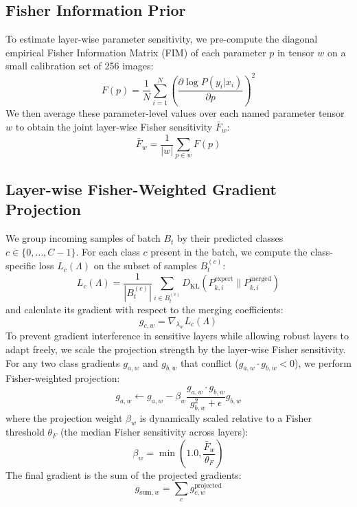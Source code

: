 \documentclass{article}
\theoremstyle{plain}
\theoremstyle{definition}
\theoremstyle{remark}
\begin{document}
\subsection{Fisher Information Prior}
To estimate layer-wise parameter sensitivity, we pre-compute the diagonal empirical Fisher Information Matrix (FIM) of each parameter $p$ in tensor $w$ on a small calibration set of 256 images:
\begin{equation}
    F(p) = \frac{1}{N} \sum_{i=1}^N \left( \frac{\partial \log P(y_i | x_i)}{\partial p} \right)^2
\end{equation}
We then average these parameter-level values over each named parameter tensor $w$ to obtain the joint layer-wise Fisher sensitivity $\bar{F}_w$:
\begin{equation}
    \bar{F}_w = \frac{1}{|w|} \sum_{p \in w} F(p)
\end{equation}

\subsection{Layer-wise Fisher-Weighted Gradient Projection}
We group incoming samples of batch $B_t$ by their predicted classes $c \in \{0, \dots, C-1\}$. For each class $c$ present in the batch, we compute the class-specific loss $L_c(\Lambda)$ on the subset of samples $B_t^{(c)}$:
\begin{equation}
    L_c(\Lambda) = \frac{1}{|B_t^{(c)}|} \sum_{i \in B_t^{(c)}} D_{\text{KL}}(P^{\text{expert}}_{k, i} \parallel P^{\text{merged}}_{k, i})
\end{equation}
and calculate its gradient with respect to the merging coefficients:
\begin{equation}
    g_{c, w} = \nabla_{\lambda_w} L_c(\Lambda)
\end{equation}
To prevent gradient interference in sensitive layers while allowing robust layers to adapt freely, we scale the projection strength by the layer-wise Fisher sensitivity. For any two class gradients $g_{a, w}$ and $g_{b, w}$ that conflict ($g_{a, w} \cdot g_{b, w} < 0$), we perform Fisher-weighted projection:
\begin{equation}
    g_{a, w} \leftarrow g_{a, w} - \beta_w \frac{g_{a, w} \cdot g_{b, w}}{g_{b, w}^2 + \epsilon} g_{b, w}
\end{equation}
where the projection weight $\beta_w$ is dynamically scaled relative to a Fisher threshold $\theta_F$ (the median Fisher sensitivity across layers):
\begin{equation}
    \beta_w = \min\left(1.0, \frac{\bar{F}_w}{\theta_F}\right)
\end{equation}
The final gradient is the sum of the projected gradients:
\begin{equation}
    g_{\text{sum}, w} = \sum_{c} g_{c, w}^{\text{projected}}
\end{equation}
\end{document}

